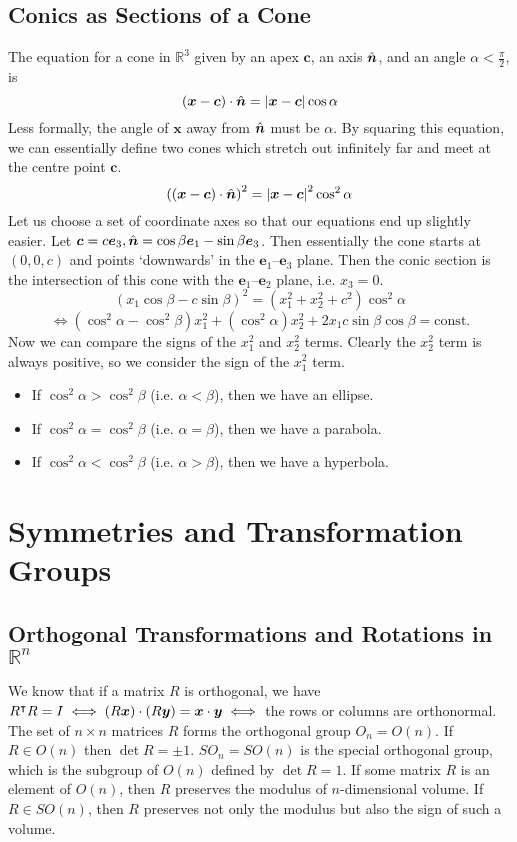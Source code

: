 \documentclass{article}
\begin{document}
\subsection{Conics as Sections of a Cone}
The equation for a cone in $\mathbb R^3$ given by an apex $\bm c$, an axis $\hat{\bm n}$, and an angle $\alpha < \frac{\pi}{2}$, is
\[ (\bm x - \bm c)\cdot\hat{\bm n} = \abs{\bm x - \bm c}\cos \alpha \]
Less formally, the angle of $\bm x$ away from $\hat{\bm n}$ must be $\alpha$. By squaring this equation, we can essentially define two cones which stretch out infinitely far and meet at the centre point $\bm c$.
\[ \left( (\bm x - \bm c)\cdot\hat{\bm n} \right)^2 = \abs{\bm x - \bm c}^2\cos^2 \alpha \]
Let us choose a set of coordinate axes so that our equations end up slightly easier. Let $\bm c = c\bm e_3, \hat{\bm n} = \cos\beta \bm e_1 - \sin\beta \bm e_3$. Then essentially the cone starts at $(0, 0, c)$ and points `downwards' in the $\bm e_1$--$\bm e_3$ plane. Then the conic section is the intersection of this cone with the $\bm e_1$--$\bm e_2$ plane, i.e. $x_3 = 0$.
\[ (x_1\cos\beta - c\sin\beta)^2 = (x_1^2 + x_2^2 + c^2)\cos^2\alpha \]
\[ \iff (\cos^2\alpha - \cos^2\beta)x_1^2 + (\cos^2\alpha)x_2^2 + 2x_1c\sin\beta\cos\beta = \text{const.} \]
Now we can compare the signs of the $x_1^2$ and $x_2^2$ terms. Clearly the $x_2^2$ term is always positive, so we consider the sign of the $x_1^2$ term.
\begin{itemize}
	\item If $\cos^2 \alpha > \cos^2\beta$ (i.e. $\alpha < \beta$), then we have an ellipse.
	\item If $\cos^2 \alpha = \cos^2\beta$ (i.e. $\alpha = \beta$), then we have a parabola.
	\item If $\cos^2 \alpha < \cos^2\beta$ (i.e. $\alpha > \beta$), then we have a hyperbola.
\end{itemize}

\section{Symmetries and Transformation Groups}
\subsection{Orthogonal Transformations and Rotations in $\mathbb R^n$}
We know that if a matrix $R$ is orthogonal, we have $R^\intercal R = I \iff (R\bm x) \cdot (R\bm y) = \bm x \cdot \bm y \iff$ the rows or columns are orthonormal. The set of $n \times n$ matrices $R$ forms the orthogonal group $O_n = O(n)$. If $R \in O(n)$ then $\det R = \pm 1$. $SO_n = SO(n)$ is the special orthogonal group, which is the subgroup of $O(n)$ defined by $\det R = 1$. If some matrix $R$ is an element of $O(n)$, then $R$ preserves the modulus of $n$-dimensional volume. If $R \in SO(n)$, then $R$ preserves not only the modulus but also the sign of such a volume.
\end{document}

